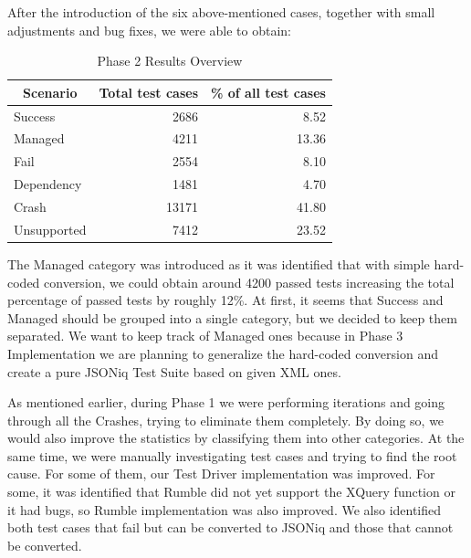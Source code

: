 After the introduction of the six above-mentioned cases, together with small adjustments and bug fixes, we were able to obtain:
\begin{table}[h!]
	\centering
	\begin{tabular}{|l|r|r|}
		\hline
		\multicolumn{1}{|c|}{Scenario} & \multicolumn{1}{c|}{Total test cases} & \multicolumn{1}{c|}{\% of all test cases} \\ \hline
		Success                        & 2686                                  & 8.52                                      \\ \hline
		Managed                        & 4211                                  & 13.36                                     \\ \hline
		Fail                           & 2554                                  & 8.10                                      \\ \hline
		Dependency                     & 1481                                  & 4.70                                      \\ \hline
		Crash                          & 13171                                 & 41.80                                     \\ \hline
		Unsupported                    & 7412                                  & 23.52                                     \\ \hline
	\end{tabular}
	\caption{Phase 2 Results Overview}
	\label{tab:Phase2_ResultTable}
\end{table}

\vspace{-5mm}
The Managed category was introduced as it was identified that with simple hard-coded conversion, we could obtain around 4200 passed tests increasing the total percentage of passed tests by roughly 12\%. At first, it seems that Success and Managed should be grouped into a single category, but we decided to keep them separated. We want to keep track of Managed ones because in Phase 3 Implementation we are planning to generalize the hard-coded conversion and create a pure JSONiq Test Suite based on given XML ones.

As mentioned earlier, during Phase 1 we were performing iterations and going through all the Crashes, trying to eliminate them completely. By doing so, we would also improve the statistics by classifying them into other categories. At the same time, we were manually investigating test cases and trying to find the root cause. For some of them, our Test Driver implementation was improved. For some, it was identified that Rumble did not yet support the XQuery function or it had bugs, so Rumble implementation was also improved. We also identified both test cases that fail but can be converted to JSONiq and those that cannot be converted.

